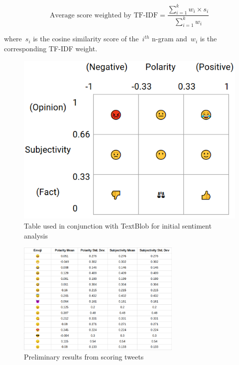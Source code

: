 \documentclass{article}[10]
\begin{document}
\begin{equation}
  \textrm{Average score weighted by
    TF-IDF} = \frac{\sum_{i=1}^{k}w_{i}\times s_i}{\sum_{i=1}^{k}w_{i}}\label{eq:averageTF-IDFScore}
\end{equation}

where~\(s_{i}\) is the cosine similarity score of the~\(i^{th}\) n-gram and~\(w_{i}\) is the corresponding TF-IDF weight.

\begin{figure}[H]
  \begin{center}
    \includegraphics[width=0.90\columnwidth]{figures/sentiment_table1.png}
    \caption{Table used in conjunction with TextBlob for initial sentiment
      analysis\label{fig:sentimentTable}}
  \end{center}
\end{figure}

\begin{figure}[h]
  \begin{center}
    \includegraphics[width=0.70\textwidth]{figures/sentiment_results1.png}
    \caption{Preliminary results from scoring tweets\label{fig:tweetScoring}}
  \end{center}
\end{figure}
\end{document}
